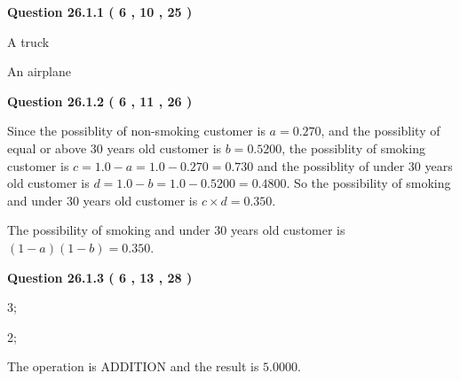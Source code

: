 \documentclass[12pt]{article}
\begin{document}
\vspace{0.2in}
  
{\textbf{\Large{Question
26.1.1 
 (           6 ,          10 ,          25 )
}}}
  
  
 
 
\noindent{}
 
 
A truck
 
 
An airplane
 
 
 
 
  
\vspace{0.2in}
  
{\textbf{\Large{Question
26.1.2 
 (           6 ,          11 ,          26 )
}}}
  
  
 
 
\noindent{}

Since the possiblity of  %
 non-smoking customer is $ a =  %
0.270 $,
and the possiblity of  %
equal or above 30 years old customer is $ b =  %
0.5200 $,
the possiblity of  %
smoking customer is $ c = 1.0 - a = 1.0 -
0.270
=  %
0.730 $ and the possiblity of  %
under 30 years old
customer is $ d = 1.0 - b = 1.0 -  %
0.5200 =  %
0.4800  $.
So the possibility of  %
smoking and  %
under 30 years old
customer is $ c \times d =  %
0.350 $.
 
 
 
 
 
\noindent{}

The possibility of  %
smoking and  %
under 30 years old
customer is $ (1-a)(1-b) =  %
0.350 $.
 
 
  
\vspace{0.2in}
  
{\textbf{\Large{Question
26.1.3 
 (           6 ,          13 ,          28 )
}}}
  
  
 
 
\noindent{}

3;
 
2;
 
The operation is  %
ADDITION and the result is
$ %
5.0000$.
 
 
 
\end{document}
